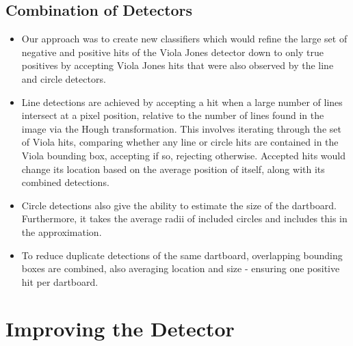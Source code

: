 \documentclass[a4paper]{article}
\begin{document}
\subsection*{Combination of Detectors}
\vspace{-0.7em}
\begin{figure}[H]
  \centering
\end{figure}

\begin{itemize}
    \item Our approach was to create new classifiers which would refine the
      large set of negative and positive hits of the Viola Jones detector down
      to only true positives by accepting Viola Jones hits that were also
      observed by the line and circle detectors.
    \item Line detections are achieved by accepting a hit when a large number
      of lines intersect at a pixel position, relative to the number of lines
      found in the image via the Hough transformation. This involves iterating
      through the set of Viola hits, comparing whether any line or circle hits
      are contained in the Viola bounding box, accepting if so, rejecting
      otherwise. Accepted hits would change its location based on the average position of itself, along with its combined detections.
    \item Circle detections also give the ability to estimate the size of the
      dartboard. Furthermore, it takes the average radii of included circles
      and includes this in the approximation.
    \item To reduce duplicate detections of the same dartboard, overlapping
      bounding boxes are combined, also averaging location and size - ensuring
      one positive hit per dartboard.
\end{itemize}



\section*{Improving the Detector}
\end{document}
